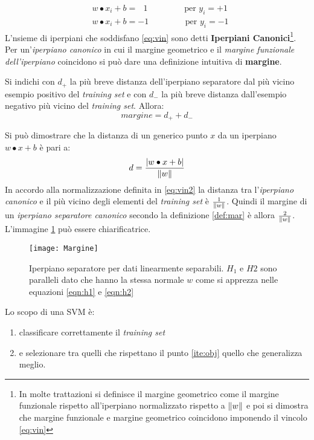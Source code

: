 \begin{align}
&w \bullet x_i + b = \:\:\:1 \qquad \qquad\text{ per } y_i = +1 \label{eqn:h1}\\
&w \bullet x_i + b = -1 \qquad \qquad\text{ per } y_i = -1  \label{eqn:h2}
\end{align}
L'nsieme di iperpiani che soddisfano \eqref{eq:vin} sono detti \textbf{Iperpiani Canonici}\footnote{In molte trattazioni si definisce il margine geometrico come il margine funzionale rispetto all'iperpiano normalizzato rispetto a $\lVert w\rVert$ e poi si dimostra che margine funzionale e margine geometrico coincidono imponendo il vincolo  \eqref{eq:vin}}.  Per un'\textit{iperpiano canonico} in cui il margine geometrico e il \textit{margine funzionale dell'iperpiano} coincidono si può dare una definizione intuitiva di \textbf{margine}.
\begin{definizione}
\label{def:mar}
Si indichi con $d_+$ la più breve distanza dell'iperpiano separatore dal più vicino esempio positivo del \textit{training set} e con $d_{-}$ la più breve distanza dall'esempio negativo più vicino del \textit{training set}. Allora:
\begin{equation*}
margine = d_{+} + d_{-}
\end{equation*}
\end{definizione}

Si può dimostrare che la distanza di un generico punto $x$ da un iperpiano $w \bullet x +b$ è pari a:
\begin{equation*}
d = \frac{\lvert w \bullet x + b\rvert}{\lVert w\rVert}
\end{equation*}
In accordo alla normalizzazione definita in \ref{eq:vin2} la distanza tra l'\textit{iperpiano canonico} e il più vicino degli elementi del \textit{training set} è $\frac{1}{\lVert w\rVert}$. Quindi il margine di un \textit{iperpiano separatore canonico} secondo la definizione \ref{def:mar} è allora $\frac{2}{\lVert w\rVert}$. L'immagine  \ref{fig:lsd} può essere chiarificatrice.\\

\begin{figure}[htp]
	\centering
	\texttt{[image: Margine]}
	\caption[Esempio iperpiano separatore]{Iperpiano separatore per dati linearmente separabili. $H_{1}$ e $H{2}$ sono paralleli dato che hanno la stessa normale $w$ come si apprezza nelle equazioni \ref{eqn:h1} e \ref{eqn:h2}}
   \label{fig:lsd}
\end{figure}

Lo scopo di una \ac{SVM} è:
\begin{enumerate}
\item \label{ite:obj}classificare correttamente il \textit{training set}
\item e selezionare tra quelli che rispettano il punto \ref{ite:obj} quello che generalizza meglio.
\end{enumerate}

